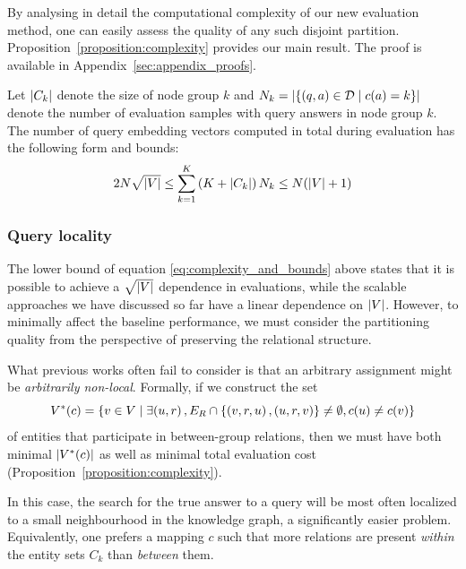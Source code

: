 By analysing in detail the computational complexity of our new evaluation method, one can easily assess the quality of any such disjoint partition. 
Proposition~\ref{proposition:complexity} provides our main result. The proof is available in Appendix~\ref{sec:appendix_proofs}.
\begin{proposition}
\label{proposition:complexity}
Let $\mathopen{}\left|C_k\right|$ denote the size of node group $k$ and $N_k=\mathopen{}\left|\mathopen{}\left\{\mathopen{}\left(q, a\right) \in \mathcal{D} \mid c\mathopen{}\left(a\right)=k\right\}\right|$ denote the number of evaluation samples with query answers in node group $k$. The number of query embedding vectors computed in total during evaluation has the following form and bounds:
\begin{equation}
\label{eq:complexity_and_bounds}
2 N \sqrt{\mathopen{}\left|V\right|} \leq \sum_{k=1}^{K}{\mathopen{}\left(K+\mathopen{}\left|C_k\right|\right)N_k} \leq N \mathopen{}\left(\mathopen{}\left|V\right| + 1\right) 
\end{equation}
\end{proposition}

\subsubsection{Query locality}
The lower bound of equation \eqref{eq:complexity_and_bounds} above states that it is possible to achieve a $\sqrt{\mathopen{}\left|V\right|}$ dependence in evaluations, while the scalable approaches we have discussed so far have a linear dependence on ${\mathopen{}\left|V\right|}$. 
However, to minimally affect the baseline performance, we must consider the partitioning quality from the perspective of preserving the relational structure. 

What previous works often fail to consider is that an arbitrary assignment might be \emph{arbitrarily non-local}. Formally, if we construct the set 
\begin{equation}
V^*\mathopen{}\left(c\right)=\mathopen{}\left\{v \in V \mid \exists \mathopen{}\left(u,r\right), E_R \cap \mathopen{}\left\{\mathopen{}\left(v,r,u\right), \mathopen{}\left(u, r, v\right)\right\} \neq \emptyset, c\mathopen{}\left(u\right) \neq c\mathopen{}\left(v\right)\right\}    
\end{equation}
of entities that participate in between-group relations, then we must have both minimal $\mathopen{}\left|V^*\mathopen{}\left(c\right)\right|$ as well as minimal total evaluation cost (Proposition~\ref{proposition:complexity}). 

In this case, the search for the true answer to a query will be most often localized to a small neighbourhood in the knowledge graph, a significantly easier problem. Equivalently, one prefers a mapping $c$ such that more relations are present \emph{within} the entity sets $C_k$ than \emph{between} them. 

